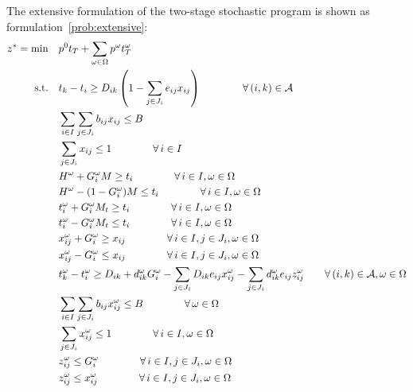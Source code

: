 \documentclass[11pt]{article}
\newcommand{\cA}{{\cal A}}
\begin{document}
	The extensive formulation of the two-stage stochastic program is shown as formulation~\eqref{prob:extensive}:
	\begin{subequations} \label{prob:extensive}
		\begin{align}
		z^* = \min \quad & p^0 t_T + \sum_{\omega \in \Omega} p^\omega t_T^\omega \\
		\text{s.t.} \quad & t_k - t_i \geq D_{ik} \left ( 1 - \sum_{j \in J_i} e_{ij} x_{ij} \right ) \qquad \qquad \forall \, (i,k) \in \cA \label{cons:Sep}\\
		& \sum_{i \in I} \sum_{j \in J_i} b_{ij}x_{ij} \leq B  \label{cons:Budget}\\
		& \sum_{j \in J_i} x_{ij} \leq 1  \qquad \qquad \forall \,i \in I \label{cons:SingleBudget}\\
		& H^\omega + G_i^\omega M \geq t_i \qquad \qquad \forall \,i \in I, \omega \in \Omega \label{cons:G1}\\
		& H^\omega - (1 - G_i^\omega) M \leq t_i \qquad \qquad \forall \,i \in I, \omega \in \Omega \label{cons:G2}\\
		& t_i^\omega + G_i^\omega M_t \geq t_i \qquad \qquad \forall \,i \in I, \omega \in \Omega \label{cons:tG1}\\
		& t_i^\omega - G_i^\omega M_t \leq t_i \qquad \qquad \forall \,i \in I, \omega \in \Omega \label{cons:tG2}\\
		& x_{ij}^\omega + G_i^\omega \geq x_{ij} \qquad \qquad \forall \,i \in I, j \in J_i, \omega \in \Omega \label{cons:xG1}\\
		& x_{ij}^\omega - G_i^\omega \leq x_{ij} \qquad \qquad \forall \,i \in I, j \in J_i, \omega \in \Omega \label{cons:xG2}\\
		& t_k^\omega - t_i^\omega \geq D_{ik} + d_{ik}^\omega G_i^\omega -\sum_{j \in J_i} D_{ik} e_{ij} x_{ij}^\omega - \sum_{j \in J_i} d_{ik}^\omega e_{ij} z_{ij}^\omega \qquad  \forall \,(i,k) \in \cA, \omega \in \Omega \label{cons:scenSep}\\
		& \sum_{i \in I}\sum_{j \in J_i} b_{ij}x_{ij}^\omega \leq B \qquad \qquad \forall \,\omega \in \Omega \label{cons:scenBudget}\\
		& \sum_{j \in J_i} x_{ij}^\omega \leq 1 \qquad \qquad \forall \,i \in I, \omega \in \Omega \label{cons:scenBudget1}\\
		& z_{ij}^\omega \leq G_i^\omega \qquad \qquad \forall \,i \in I, j \in J_i, \omega \in \Omega \label{cons:linearize1}\\
		& z_{ij}^\omega \leq x_{ij}^\omega \qquad \qquad \forall \,i \in I, j \in J_i, \omega \in \Omega \label{cons:linearize2}\\

\end{align}
\end{subequations}
\end{document}
